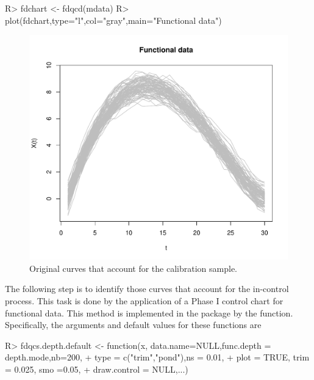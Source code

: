\begin{example}
R> fdchart <- fdqcd(mdata)
R> plot(fdchart,type="l",col="gray",main="Functional data")
\end{example}


\begin{figure}[!htb]
\begin{center}
\includegraphics[width=\textwidth]{fda_1}
\caption{Original curves that account for the calibration sample.}
\label{fig:fda_1}
\end{center}
\end{figure}

The following step is to identify those curves that account for the in-control process. This task is done by the application of a Phase I control chart for functional data. This method is implemented in the  package by the  function. Specifically, the arguments and default values for these functions are 

\begin{example}
R> fdqcs.depth.default <- function(x, data.name=NULL,func.depth = depth.mode,nb=200,
+                                 type = c("trim","pond"),ns =  0.01, 
+                                 plot = TRUE, trim = 0.025, smo =0.05,
+                                 draw.control = NULL,...)
\end{example}

